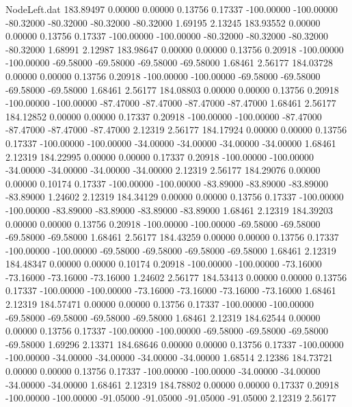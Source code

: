 \begin{filecontents}{NodeLeft.dat}
 183.89497    0.00000    0.00000     0.13756    0.17337 -100.00000 -100.00000  -80.32000  -80.32000  -80.32000  -80.32000    1.69195    2.13245
 183.93552    0.00000    0.00000     0.13756    0.17337 -100.00000 -100.00000  -80.32000  -80.32000  -80.32000  -80.32000    1.68991    2.12987
 183.98647    0.00000    0.00000     0.13756    0.20918 -100.00000 -100.00000  -69.58000  -69.58000  -69.58000  -69.58000    1.68461    2.56177
 184.03728    0.00000    0.00000     0.13756    0.20918 -100.00000 -100.00000  -69.58000  -69.58000  -69.58000  -69.58000    1.68461    2.56177
 184.08803    0.00000    0.00000     0.13756    0.20918 -100.00000 -100.00000  -87.47000  -87.47000  -87.47000  -87.47000    1.68461    2.56177
 184.12852    0.00000    0.00000     0.17337    0.20918 -100.00000 -100.00000  -87.47000  -87.47000  -87.47000  -87.47000    2.12319    2.56177
 184.17924    0.00000    0.00000     0.13756    0.17337 -100.00000 -100.00000  -34.00000  -34.00000  -34.00000  -34.00000    1.68461    2.12319
 184.22995    0.00000    0.00000     0.17337    0.20918 -100.00000 -100.00000  -34.00000  -34.00000  -34.00000  -34.00000    2.12319    2.56177
 184.29076    0.00000    0.00000     0.10174    0.17337 -100.00000 -100.00000  -83.89000  -83.89000  -83.89000  -83.89000    1.24602    2.12319
 184.34129    0.00000    0.00000     0.13756    0.17337 -100.00000 -100.00000  -83.89000  -83.89000  -83.89000  -83.89000    1.68461    2.12319
 184.39203    0.00000    0.00000     0.13756    0.20918 -100.00000 -100.00000  -69.58000  -69.58000  -69.58000  -69.58000    1.68461    2.56177
 184.43259    0.00000    0.00000     0.13756    0.17337 -100.00000 -100.00000  -69.58000  -69.58000  -69.58000  -69.58000    1.68461    2.12319
 184.48347    0.00000    0.00000     0.10174    0.20918 -100.00000 -100.00000  -73.16000  -73.16000  -73.16000  -73.16000    1.24602    2.56177
 184.53413    0.00000    0.00000     0.13756    0.17337 -100.00000 -100.00000  -73.16000  -73.16000  -73.16000  -73.16000    1.68461    2.12319
 184.57471    0.00000    0.00000     0.13756    0.17337 -100.00000 -100.00000  -69.58000  -69.58000  -69.58000  -69.58000    1.68461    2.12319
 184.62544    0.00000    0.00000     0.13756    0.17337 -100.00000 -100.00000  -69.58000  -69.58000  -69.58000  -69.58000    1.69296    2.13371
 184.68646    0.00000    0.00000     0.13756    0.17337 -100.00000 -100.00000  -34.00000  -34.00000  -34.00000  -34.00000    1.68514    2.12386
 184.73721    0.00000    0.00000     0.13756    0.17337 -100.00000 -100.00000  -34.00000  -34.00000  -34.00000  -34.00000    1.68461    2.12319
 184.78802    0.00000    0.00000     0.17337    0.20918 -100.00000 -100.00000  -91.05000  -91.05000  -91.05000  -91.05000    2.12319    2.56177

\end{filecontents}
